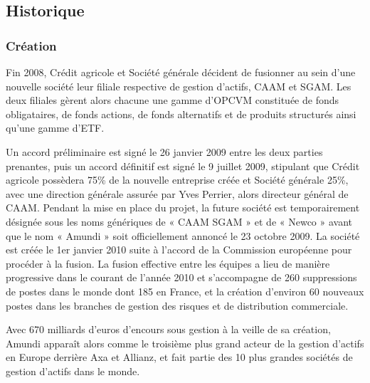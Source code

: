 \subsection{Historique}
\subsubsection{Création}
\par Fin 2008, Crédit agricole et Société générale décident de fusionner au sein d'une nouvelle société leur filiale respective de gestion d'actifs, CAAM et SGAM. Les deux filiales gèrent alors chacune une gamme d'OPCVM constituée de fonds obligataires, de fonds actions, de fonds alternatifs et de produits structurés ainsi qu'une gamme d'ETF.
\par Un accord préliminaire est signé le 26 janvier 2009 entre les deux parties prenantes, puis un accord définitif est signé le 9 juillet 2009, stipulant que Crédit agricole possèdera 75\% de la nouvelle entreprise créée et Société générale 25\%, avec une direction générale assurée par Yves Perrier, alors directeur général de CAAM. Pendant la mise en place du projet, la future société est temporairement désignée sous les noms génériques de « CAAM SGAM » et de « Newco » avant que le nom « Amundi » soit officiellement annoncé le 23 octobre 2009. La société est créée le 1er janvier 2010 suite à l'accord de la Commission européenne pour procéder à la fusion. La fusion effective entre les équipes a lieu de manière progressive dans le courant de l'année 2010 et s'accompagne de 260 suppressions de postes dans le monde dont 185 en France, et la création d'environ 60 nouveaux postes dans les branches de gestion des risques et de distribution commerciale.
\par Avec 670 milliards d'euros d'encours sous gestion à la veille de sa création, Amundi apparaît alors comme le troisième plus grand acteur de la gestion d'actifs en Europe derrière Axa et Allianz, et fait partie des 10 plus grandes sociétés de gestion d'actifs dans le monde.

